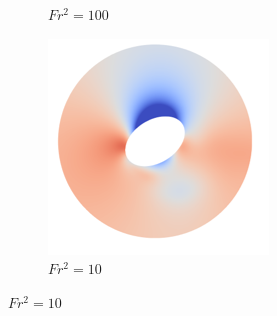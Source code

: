 \begin{figure}
\begin{subfigure}[b]{0.25\textwidth}
        \caption{$Fr^2 = 100$}
        \label{fig:par1p5fs100}
    \end{subfigure}
    \hfill
    \begin{subfigure}[b]{0.25\textwidth}
        \centering
        \includegraphics[width=\textwidth]{images/spinning_ellipse/par1p5fs10.png}
        \caption{$Fr^2 = 10$}
        \label{fig:par1p5fs10}
    \end{subfigure}
    

\end{figure}
